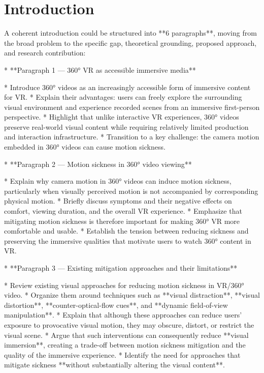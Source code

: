 \section{Introduction}

A coherent introduction could be structured into **6 paragraphs**, moving from the broad problem to the specific gap, theoretical grounding, proposed approach, and research contribution:

* **Paragraph 1 — 360° VR as accessible immersive media**

  * Introduce 360° videos as an increasingly accessible form of immersive content for VR.
  * Explain their advantages: users can freely explore the surrounding visual environment and experience recorded scenes from an immersive first-person perspective.
  * Highlight that unlike interactive VR experiences, 360° videos preserve real-world visual content while requiring relatively limited production and interaction infrastructure.
  * Transition to a key challenge: the camera motion embedded in 360° videos can cause motion sickness.

* **Paragraph 2 — Motion sickness in 360° video viewing**

  * Explain why camera motion in 360° videos can induce motion sickness, particularly when visually perceived motion is not accompanied by corresponding physical motion.
  * Briefly discuss symptoms and their negative effects on comfort, viewing duration, and the overall VR experience.
  * Emphasize that mitigating motion sickness is therefore important for making 360° VR more comfortable and usable.
  * Establish the tension between reducing sickness and preserving the immersive qualities that motivate users to watch 360° content in VR.

* **Paragraph 3 — Existing mitigation approaches and their limitations**

  * Review existing visual approaches for reducing motion sickness in VR/360° video.
  * Organize them around techniques such as **visual distraction**, **visual distortion**, **counter-optical-flow cues**, and **dynamic field-of-view manipulation**.
  * Explain that although these approaches can reduce users' exposure to provocative visual motion, they may obscure, distort, or restrict the visual scene.
  * Argue that such interventions can consequently reduce **visual immersion**, creating a trade-off between motion sickness mitigation and the quality of the immersive experience.
  * Identify the need for approaches that mitigate sickness **without substantially altering the visual content**.

